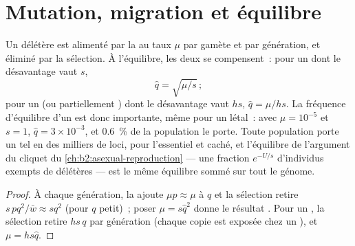 \section{Mutation, migration et équilibre}

\begin{theorem}\label{thm:b2:population-genetics:balance}
Un  délétère est alimenté par la  au taux $\mu$ par gamète
et par génération, et éliminé par la sélection. À l'équilibre, les deux
se compensent~: pour un   dont le désavantage  vaut $s$,
\[
\hat q = \sqrt{\mu/s}\,;
\]
pour un   (ou partiellement ) dont le désavantage
 vaut $hs$, $\hat q = \mu/hs$. La fréquence d'équilibre d'un
 est donc importante, même pour un létal~: avec $\mu = 10^{-5}$ et
$s = 1$, $\hat q = 3\times 10^{-3}$, et \qty{0.6}{\%} de la population
le porte. Toute population porte un tel \emph{} en des
milliers de loci, pour l'essentiel  et caché, et l'équilibre de
l'argument du cliquet du \cref{ch:b2:asexual-reproduction}
--- une fraction $e^{-U/s}$ d'individus exempts de 
délétères --- est le même équilibre sommé sur tout le génome.
\end{theorem}
\begin{proof}
À chaque génération, la  ajoute $\mu p \approx \mu$ à $q$ et la
sélection retire $s\,pq^{2}/\bar w \approx sq^{2}$ (pour $q$ petit)~;
poser $\mu = s\hat q^{2}$ donne le résultat . Pour un 
, la sélection retire $hs\,q$ par génération (chaque copie est
exposée chez un ), et $\mu = hs\hat q$.
\end{proof}

